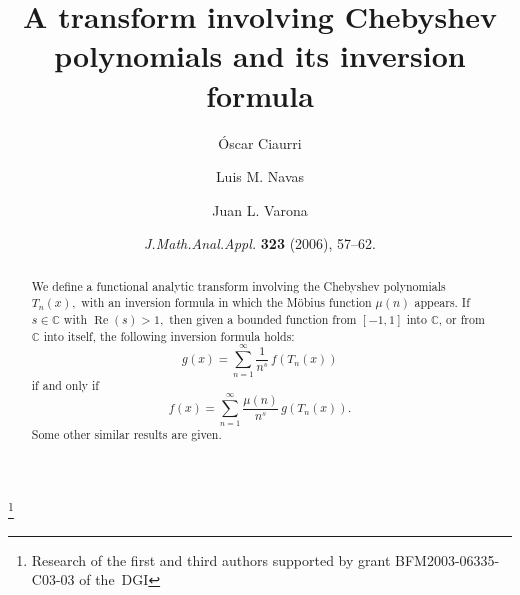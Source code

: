\documentclass[10pt,a4paper]{amsart}
\date{\textit{J.\@ Math.\@ Anal.\@ Appl.\@} \textbf{323} (2006), 57--62.}
\theoremstyle{plain}
\theoremstyle{remark}
\begin{document}


\title[A transform involving Chebyshev polynomials]{A transform involving
Chebyshev polynomials and its inversion formula}


\author{\'Oscar Ciaurri}
\address{
        Departamento de Matem\'aticas y Computaci\'on \\
        Universidad de La Rioja                       \\
        Calle Luis de Ulloa s/n                       \\
        26004 Logro\~no, Spain}

\author{Luis M. Navas}
\address{
        Departamento de Matem\'aticas                \\
        Universidad de Salamanca                     \\
        Plaza de la Merced 1-4                       \\
        37008 Salamanca, Spain}

\author{Juan L. Varona}
\address{
        Departamento de Matem\'aticas y Computaci\'on \\
        Universidad de La Rioja                       \\
        Calle Luis de Ulloa s/n                       \\
        26004 Logro\~no, Spain}

\thanks{Research of the first and third authors supported by grant
BFM2003-06335-C03-03 of the~DGI}




\begin{abstract}
We define a functional analytic transform involving the Chebyshev polynomials
$T_{n}(x),$ with an inversion formula in which the M\"obius function $\mu(n)$
appears. If $s \in \mathbb{C}$ with $\operatorname{Re}(s) > 1,$ then given a
bounded function from $[-1,1]$ into $\mathbb{C}$, or from $\mathbb{C}$ into
itself, the following inversion formula holds:
$$
  g(x) = \sum_{n=1}^\infty \frac{1}{n^s}\, f(T_n(x))
$$
if and only if
$$
  f(x) = \sum_{n=1}^\infty \frac{\mu(n)}{n^s}\, g(T_n(x)).
$$
Some other similar results are given.
\end{abstract}
\end{document}
